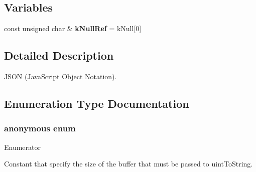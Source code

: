 \subsection*{Variables}
\begin{DoxyCompactItemize}
\item 
\hypertarget{namespace_json_ab30055b4bbd82aecaca57ccecd63bbe6}{}const unsigned char \& {\bfseries k\+Null\+Ref} = k\+Null\mbox{[}0\mbox{]}\label{namespace_json_ab30055b4bbd82aecaca57ccecd63bbe6}

\end{DoxyCompactItemize}


\subsection{Detailed Description}
J\+S\+O\+N (Java\+Script Object Notation). 

\subsection{Enumeration Type Documentation}
\hypertarget{namespace_json_a2aacab54ef6fc18e833fbd4982a0a23a}{}\subsubsection[{anonymous enum}]{\setlength{\rightskip}{0pt plus 5cm}anonymous enum}\label{namespace_json_a2aacab54ef6fc18e833fbd4982a0a23a}
\begin{Desc}
\item[Enumerator]\par
\begin{description}
\item[{\em 
\hypertarget{namespace_json_a2aacab54ef6fc18e833fbd4982a0a23aae4f2008c7919f20d81286121d1374424}{}uint\+To\+String\+Buffer\+Size\label{namespace_json_a2aacab54ef6fc18e833fbd4982a0a23aae4f2008c7919f20d81286121d1374424}
}]Constant that specify the size of the buffer that must be passed to uint\+To\+String. \end{description}
\end{Desc}
\hypertarget{namespace_json_a4fc417c23905b2ae9e2c47d197a45351}{}
